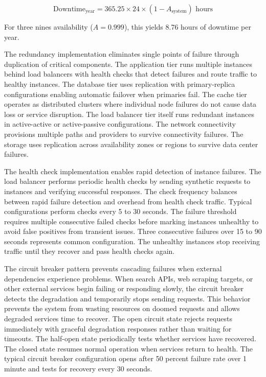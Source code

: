 \begin{equation}
\text{Downtime}_{\text{year}} = 365.25 \times 24 \times (1 - A_{\text{system}}) \text{ hours}
\label{eq:downtime}
\end{equation}

For three nines availability ($A = 0.999$), this yields 8.76 hours of downtime per year.

The redundancy implementation eliminates single points of failure through duplication of critical components. The application tier runs multiple instances behind load balancers with health checks that detect failures and route traffic to healthy instances. The database tier uses replication with primary-replica configurations enabling automatic failover when primaries fail. The cache tier operates as distributed clusters where individual node failures do not cause data loss or service disruption. The load balancer tier itself runs redundant instances in active-active or active-passive configurations. The network connectivity provisions multiple paths and providers to survive connectivity failures. The storage uses replication across availability zones or regions to survive data center failures.

The health check implementation enables rapid detection of instance failures. The load balancer performs periodic health checks by sending synthetic requests to instances and verifying successful responses. The check frequency balances between rapid failure detection and overhead from health check traffic. Typical configurations perform checks every 5 to 30 seconds. The failure threshold requires multiple consecutive failed checks before marking instances unhealthy to avoid false positives from transient issues. Three consecutive failures over 15 to 90 seconds represents common configuration. The unhealthy instances stop receiving traffic until they recover and pass health checks again.

The circuit breaker pattern prevents cascading failures when external dependencies experience problems. When search APIs, web scraping targets, or other external services begin failing or responding slowly, the circuit breaker detects the degradation and temporarily stops sending requests. This behavior prevents the system from wasting resources on doomed requests and allows degraded services time to recover. The open circuit state rejects requests immediately with graceful degradation responses rather than waiting for timeouts. The half-open state periodically tests whether services have recovered. The closed state resumes normal operation when services return to health. The typical circuit breaker configuration opens after 50 percent failure rate over 1 minute and tests for recovery every 30 seconds.

